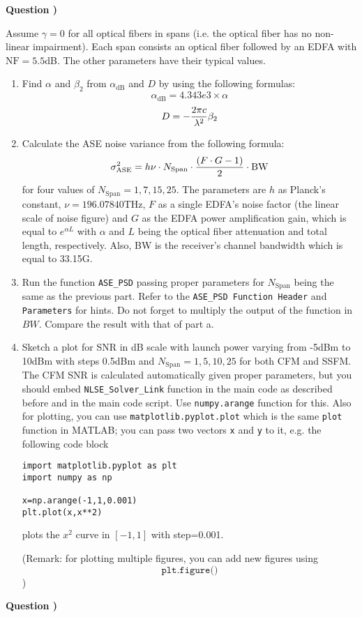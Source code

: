 \documentclass[10pt,letterpaper]{article}
\newcommand{\Span}{\text{Span}}
\newcommand{\NF}{\text{NF}}
\newcommand{\ASE}{\text{ASE}}
\newcounter{QuestionNumber}
\newcommand{\Q}{
\textbf{Question \theQuestionNumber)}
\stepcounter{QuestionNumber}
}
\begin{document}
\Q 

Assume $\gamma=0$ for all optical fibers in spans (i.e. the optical fiber has no non-linear impairment). Each span consists an optical fiber followed by an EDFA with $\NF=5.5 $dB. The other parameters have their typical values.
\begin{enumerate}[label=\alph*-]
\item
Find $\alpha$ and $\beta_2$ from $\alpha_{\text{dB}}$ and $D$ by using the following formulas:
$$
\alpha_{\text{dB}}=4.343e3\times\alpha
$$
$$
D=-{2\pi c\over\lambda^2}\beta_2
$$
\item
Calculate the ASE noise variance from the following formula:
$$
\sigma^2_{\ASE}=h\nu\cdot N_{\Span}\cdot {(F\cdot G-1)\over 2}\cdot \text{BW}
$$
for four values of $N_\Span=1,7,15,25$.
The parameters are $h$ as Planck's constant, $\nu=196.07840$THz, $F$ as a single EDFA's noise factor (the linear scale of noise figure) and $G$ as the EDFA power amplification gain, which is equal to $e^{\alpha L}$ with $\alpha$ and $L$ being the optical fiber attenuation and total length, respectively. Also, BW is the receiver's channel bandwidth which is equal to 33.15G.
\item
Run the function \texttt{ASE\_PSD} passing proper parameters for $N_\Span$ being the same as the previous part. Refer to the \texttt{ASE\_PSD Function Header} and \texttt{Parameters} for hints. Do not forget to multiply the output of the function in $BW$. Compare the result with that of part a.
\item 
Sketch a plot for SNR in dB scale with launch power varying from -5dBm to 10dBm with steps 0.5dBm and $N_\Span=1,5,10,25$ for both CFM and SSFM. The CFM SNR is calculated automatically given proper parameters, but you should embed \texttt{NLSE\_Solver\_Link} function in the main code as described before and in the main code script. Use \texttt{numpy.arange} function for this. Also for plotting, you can use \texttt{matplotlib.pyplot.plot} which is the same \texttt{plot} function in MATLAB; you can pass two vectors \texttt{x} and \texttt{y} to it, e.g. the following code block
\begin{lstlisting}
import matplotlib.pyplot as plt
import numpy as np

x=np.arange(-1,1,0.001)
plt.plot(x,x**2)
\end{lstlisting}
plots the $x^2$ curve in $[-1,1]$ with step=0.001.

(Remark: for plotting multiple figures, you can add new figures using 
$$
\texttt{plt.figure()}
$$
)
\end{enumerate}
\Q
\end{document}
